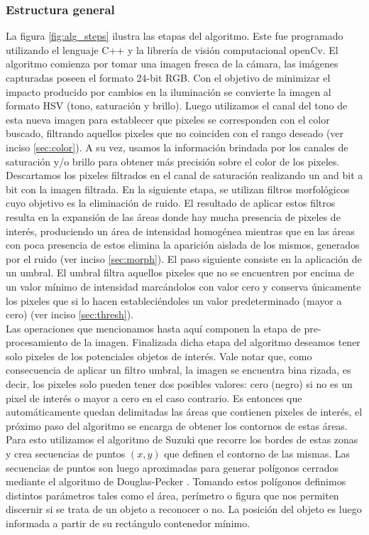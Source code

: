 \subsubsection{Estructura general}
La figura \ref{fig:alg_steps} ilustra las etapas del algoritmo. Este fue programado utilizando el lenguaje C++ y la librería de visión computacional openCv.
El algoritmo comienza por tomar una imagen fresca de la cámara, las 
imágenes capturadas poseen el formato 24-bit RGB. Con el objetivo de 
minimizar el impacto producido por cambios en la iluminación se 
convierte la imagen al formato HSV (tono, saturación y brillo). Luego 
utilizamos el canal del tono de esta nueva imagen para establecer que 
pixeles se corresponden con el color buscado, filtrando aquellos 
pixeles que no coinciden con el rango deseado (ver inciso 
\ref{sec:color}). A su vez, usamos la información brindada por los  canales de saturación y/o brillo para obtener más precisión sobre el color de los pixeles.\\
	\indent Descartamos los pixeles filtrados en el canal de saturación 
	realizando un and bit a bit con la imagen filtrada.  En la siguiente 
	etapa, se utilizan filtros morfológicos cuyo objetivo es la 
	eliminación de ruido. El resultado de aplicar estos filtros resulta 
	en la expansión de las áreas donde hay mucha presencia de pixeles de 
	interés, produciendo un área de intensidad homogénea mientras que 
	en las áreas con poca presencia de estos 
	elimina la aparición aislada de los mismos, generados por el ruido (ver 
	inciso \ref{sec:morph}). El paso 
	siguiente consiste en la aplicación de un umbral. El umbral filtra 
	aquellos pixeles que no se encuentren por encima de un valor mínimo 
	de intensidad marcándolos con valor cero y conserva únicamente los 
	pixeles que si lo hacen estableciéndoles un valor predeterminado 
	(mayor a cero) (ver inciso \ref{sec:thresh}). \\
	\indent Las operaciones que mencionamos hasta aquí componen la 
	etapa de  pre-procesamiento de la imagen. Finalizada dicha etapa del 
	algoritmo deseamos tener solo pixeles de los potenciales objetos de 
	interés. Vale notar que, como consecuencia de aplicar un filtro 
	umbral, la imagen se encuentra bina rizada, es decir, los pixeles solo 
	pueden tener dos posibles valores: cero (negro) si no es un pixel de 
	interés o mayor a cero en el caso contrario. Es entonces que 
	automáticamente quedan delimitadas las áreas que contienen pixeles 
	de interés, el próximo paso del algoritmo se encarga de obtener los 
	contornos de estas áreas. Para esto utilizamos el algoritmo de Suzuki 
	\cite{suzuki85} que recorre los bordes de estas zonas y crea 
	secuencias de puntos $(x,y)$ que definen el contorno de las mismas. 
	Las secuencias de puntos son luego aproximadas para generar polígonos 
	cerrados mediante el algoritmo de Douglas-Pecker \cite{dp74}. Tomando 
	estos polígonos definimos distintos parámetros tales como el área, 
	perímetro o figura que nos permiten discernir si se trata de un objeto 
	a reconocer o no. La posición del objeto es luego informada a 
	partir de su rectángulo contenedor mínimo.


